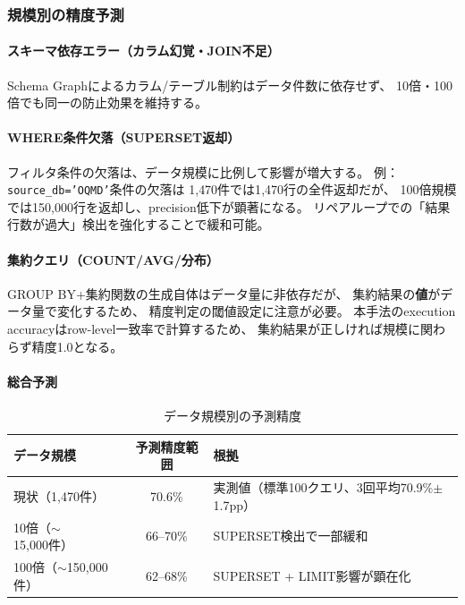 \documentclass[5p,twocolumn]{elsarticle}
\begin{document}
\subsubsection{規模別の精度予測}

\paragraph{スキーマ依存エラー（カラム幻覚・JOIN不足）}
Schema Graphによるカラム/テーブル制約はデータ件数に依存せず、
10倍・100倍でも同一の防止効果を維持する。

\paragraph{WHERE条件欠落（SUPERSET返却）}
フィルタ条件の欠落は、データ規模に比例して影響が増大する。
例：\texttt{source\_db='OQMD'}条件の欠落は
1{,}470件では1{,}470行の全件返却だが、
100倍規模では150{,}000行を返却し、precision低下が顕著になる。
リペアループでの「結果行数が過大」検出を強化することで緩和可能。

\paragraph{集約クエリ（COUNT/AVG/分布）}
GROUP BY+集約関数の生成自体はデータ量に非依存だが、
集約結果の\textbf{値}がデータ量で変化するため、
精度判定の閾値設定に注意が必要。
本手法のexecution accuracyはrow-level一致率で計算するため、
集約結果が正しければ規模に関わらず精度1.0となる。

\paragraph{総合予測}

\begin{table}[tbp]
\centering
\caption{データ規模別の予測精度}
\label{tab:scale_accuracy}
\footnotesize
\begin{tabular}{lcp{3.2cm}}
\hline
データ規模 & 予測精度範囲 & 根拠 \\
\hline
現状（1{,}470件） & 70.6\% & 実測値（標準100クエリ、3回平均70.9\%$\pm$1.7pp） \\
10倍（${\sim}$15{,}000件） & 66--70\% & SUPERSET検出で一部緩和 \\
100倍（${\sim}$150{,}000件） & 62--68\% & SUPERSET + LIMIT影響が顕在化 \\
\hline
\end{tabular}
\end{table}
\end{document}
